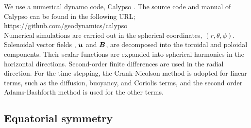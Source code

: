 We use a numerical dynamo code, Calypso \cite{Matsui:2014}.
%
The source code and manual of Calypso can be found in the following URL;\\
https://github.com/geodynamics/calypso\\
%
Numerical simulations are carried out in the spherical coordinates, $(r, \theta, \phi)$.
Solenoidal vector fields , $\mbox{\boldmath$u$}$ and $\mbox{\boldmath$B$}$, are decomposed into the toroidal and poloidal components.
Their scalar functions are expanded into spherical harmonics in the horizontal directions.
Second-order finite differences are used in the radial direction.
For the time stepping, the Crank-Nicolson method is adopted for linear terms, such as the diffusion, buoyancy, and Coriolis terms, and the second order Adams-Bashforth method is used for the other terms.

\subsection{Equatorial symmetry}

